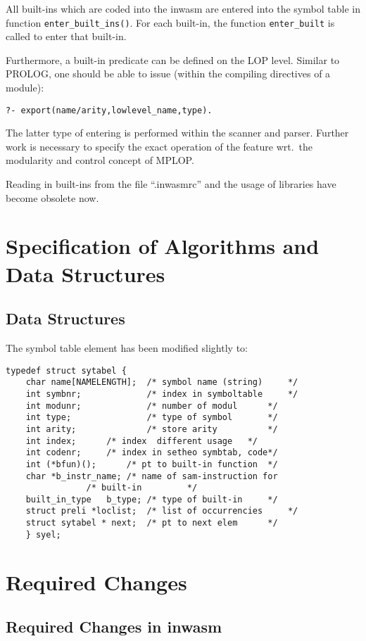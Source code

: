 All built-ins which are coded into the inwasm are entered into the
symbol table in function {\tt enter\_built\_ins()}. For each built-in,
the function {\tt enter\_built} is called to enter that built-in.

Furthermore, a built-in predicate can be defined on the LOP
level.
Similar to PROLOG, one should be able to issue (within the
compiling directives of a module):

{\tt ?- export(name/arity,lowlevel\_name,type).}

The latter type of entering is performed within the scanner and parser.
Further work is necessary to specify the exact operation of the feature
wrt.\ the modularity and control concept of MPLOP.

Reading in built-ins from the file ``.inwasmrc'' and the usage of
libraries have become obsolete now.


\section{Specification of Algorithms and Data Structures}

\subsection{Data Structures}

The symbol table element has been modified slightly to:

\begin{verbatim}
typedef struct sytabel {
	char name[NAMELENGTH];	/* symbol name (string) 	*/
	int symbnr;             /* index in symboltable 	*/
	int modunr;             /* number of modul		*/
	int type;               /* type of symbol 		*/
	int arity;              /* store arity  		*/
	int index;		/* index  different usage 	*/
	int codenr;		/* index in setheo symbtab, code*/
	int (*bfun)();		/* pt to built-in function 	*/
	char *b_instr_name;	/* name of sam-instruction for
				/* built-in			*/
	built_in_type	b_type;	/* type of built-in		*/
	struct preli *loclist;  /* list of occurrencies 	*/
	struct sytabel * next;  /* pt to next elem 		*/
	} syel;
\end{verbatim}

\section{Required Changes}
\subsection{Required Changes in inwasm}

